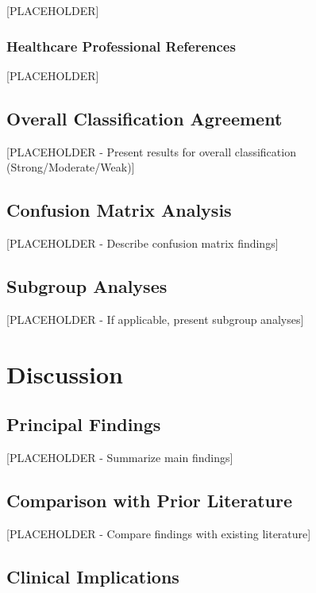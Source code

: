 \documentclass[12pt]{article}
\begin{document}
[PLACEHOLDER]

\subsubsection{Healthcare Professional References}

[PLACEHOLDER]

\subsection{Overall Classification Agreement}

[PLACEHOLDER - Present results for overall classification (Strong/Moderate/Weak)]

\subsection{Confusion Matrix Analysis}

[PLACEHOLDER - Describe confusion matrix findings]

\subsection{Subgroup Analyses}

[PLACEHOLDER - If applicable, present subgroup analyses]

\newpage

\section{Discussion}

\subsection{Principal Findings}

[PLACEHOLDER - Summarize main findings]

\subsection{Comparison with Prior Literature}

[PLACEHOLDER - Compare findings with existing literature]

\subsection{Clinical Implications}
\end{document}
